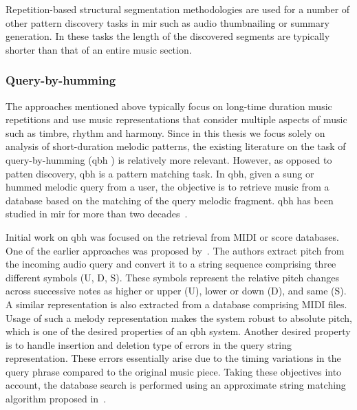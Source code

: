 Repetition-based structural segmentation methodologies are used for a number of other pattern discovery tasks in \gls{mir} such as audio thumbnailing or summary generation. In these tasks the length of the discovered segments are typically shorter than that of an entire music section.  
 


\subsubsection{Query-by-humming}
\label{sec:query_by_humming}

The approaches mentioned above typically focus on long-time duration music repetitions  and use music representations that consider multiple aspects of music such as timbre, rhythm and harmony. Since in this thesis we focus solely on analysis of short-duration melodic patterns, the existing literature on the task of query-by-humming (\gls{qbh} ) is relatively more relevant. However, as opposed to patten discovery, \gls{qbh}  is a pattern matching task. In \gls{qbh}, given a sung or hummed melodic query from a user, the objective is to retrieve music from a database based on the matching of the query melodic fragment. \gls{qbh}  has been studied in \gls{mir} for more than two decades~\cite{ghias1995query,McNab1996}.

Initial work on \gls{qbh}  was focused on the retrieval from MIDI or score databases. One of the earlier approaches was proposed by~\cite{ghias1995query}. The authors extract pitch from the incoming audio query and convert it to a string sequence comprising three different symbols (U, D, S). These symbols represent the relative pitch changes across successive notes as higher or upper (U), lower or down (D), and same (S). A similar representation is also extracted from a database comprising MIDI files. Usage of such a melody representation makes the system robust to absolute pitch, which is one of the desired properties of an \gls{qbh} system. Another desired property is to handle insertion and deletion type of errors in the query string representation. These errors essentially arise due to the timing variations in the query phrase compared to the original music piece. Taking these objectives into account, the database search is performed using an approximate string matching algorithm proposed in~\cite{baeza1992fast}.

